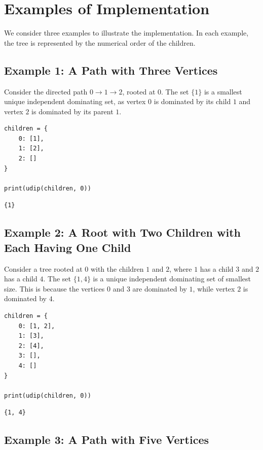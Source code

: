 \documentclass[ a4paper, 11pt]{report}
\theoremstyle{plain}
\theoremstyle{definition}
\begin{document}
\section{Examples of Implementation}

We consider three examples to illustrate the implementation. In each example, the tree is represented by the numerical order of the children.

\subsection{Example 1: A Path with Three Vertices}

Consider the directed path $0\rightarrow 1\rightarrow 2$, rooted at $0$. The set $\{1\}$ is a smallest unique independent dominating set, as vertex $0$ is dominated by its child $1$ and vertex $2$ is dominated by its parent $1$.

\begin{verbatim}
children = {
    0: [1],
    1: [2],
    2: []
}

print(udip(children, 0))
\end{verbatim}



\begin{verbatim}
{1}
\end{verbatim}

\subsection{Example 2: A Root with Two Children with Each Having One Child}

Consider a tree rooted at $0$ with the children $1$ and $2$, where $1$ has a child $3$ and $2$ has a child $4$. The set $\{1,4\}$ is a unique independent dominating set of smallest size. This is because the vertices $0$ and $3$ are dominated by $1$, while vertex $2$ is dominated by $4$.

\begin{verbatim}
children = {
    0: [1, 2],
    1: [3],
    2: [4],
    3: [],
    4: []
}

print(udip(children, 0))
\end{verbatim}



\begin{verbatim}
{1, 4}
\end{verbatim}

\subsection{Example 3: A Path with Five Vertices}
\end{document}
